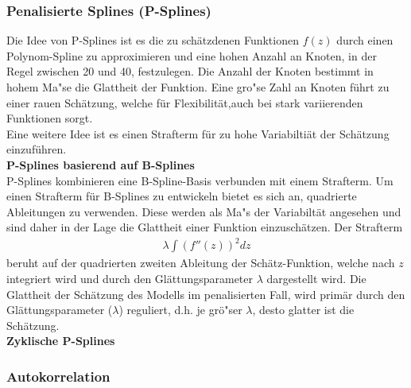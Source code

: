 \documentclass[12pt]{article}
\begin{document}
	\subsubsection{Penalisierte Splines (P-Splines)} 
	Die Idee von P-Splines ist es die zu schätzdenen Funktionen $f(z)$ durch einen Polynom-Spline zu approximieren und eine hohen Anzahl an Knoten, in der Regel zwischen 20 und 40, festzulegen. Die Anzahl der Knoten bestimmt in hohem Ma"se die Glattheit der Funktion. Eine gro"se Zahl an Knoten führt zu einer rauen Schätzung, welche für Flexibilität,auch bei stark variierenden Funktionen sorgt. \\
	Eine weitere Idee ist es einen Strafterm für zu hohe Variabiltiät der Schätzung einzuführen. \\
	\newpage
	\noindent\textbf{P-Splines basierend auf B-Splines} \\
	P-Splines kombinieren eine B-Spline-Basis verbunden mit einem Strafterm. Um einen Strafterm für B-Splines zu entwickeln bietet es sich an, quadrierte Ableitungen zu verwenden. Diese werden als Ma"s der Variabiltät angesehen und sind daher in der Lage die Glattheit einer Funktion einzuschätzen.
	Der Strafterm 
	\begin{align}
	\lambda\int(f''(z))^2dz
	\end{align}
	beruht auf der quadrierten zweiten Ableitung der Schätz-Funktion, welche nach $z$ integriert wird und durch den Glättungsparameter $\lambda$ dargestellt wird. Die Glattheit der Schätzung des Modells im penalisierten Fall, wird primär durch den Glättungsparameter ($\lambda$) reguliert, d.h. je grö"ser $\lambda$, desto glatter ist die Schätzung.\\
	
	\noindent\textbf{Zyklische P-Splines} \\
	
	\subsubsection{Autokorrelation} 
	
	


	
\end{document}
